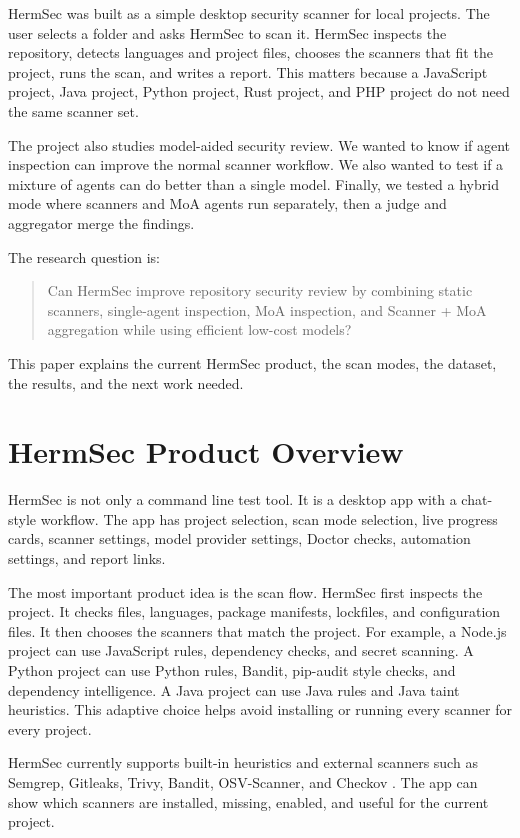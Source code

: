 \documentclass[sigconf,nonacm]{acmart}
\begin{document}
HermSec was built as a simple desktop security scanner for local projects. The user selects a folder and asks HermSec to scan it. HermSec inspects the repository, detects languages and project files, chooses the scanners that fit the project, runs the scan, and writes a report. This matters because a JavaScript project, Java project, Python project, Rust project, and PHP project do not need the same scanner set.

The project also studies model-aided security review. We wanted to know if agent inspection can improve the normal scanner workflow. We also wanted to test if a mixture of agents can do better than a single model. Finally, we tested a hybrid mode where scanners and MoA agents run separately, then a judge and aggregator merge the findings.

The research question is:

\begin{quote}
Can HermSec improve repository security review by combining static scanners, single-agent inspection, MoA inspection, and Scanner + MoA aggregation while using efficient low-cost models?
\end{quote}

This paper explains the current HermSec product, the scan modes, the dataset, the results, and the next work needed.

\section{HermSec Product Overview}
HermSec is not only a command line test tool. It is a desktop app with a chat-style workflow. The app has project selection, scan mode selection, live progress cards, scanner settings, model provider settings, Doctor checks, automation settings, and report links.

The most important product idea is the scan flow. HermSec first inspects the project. It checks files, languages, package manifests, lockfiles, and configuration files. It then chooses the scanners that match the project. For example, a Node.js project can use JavaScript rules, dependency checks, and secret scanning. A Python project can use Python rules, Bandit, pip-audit style checks, and dependency intelligence. A Java project can use Java rules and Java taint heuristics. This adaptive choice helps avoid installing or running every scanner for every project.

HermSec currently supports built-in heuristics and external scanners such as Semgrep, Gitleaks, Trivy, Bandit, OSV-Scanner, and Checkov \cite{semgrep,gitleaks,trivy,bandit,osvscanner,checkov}. The app can show which scanners are installed, missing, enabled, and useful for the current project.
\end{document}
